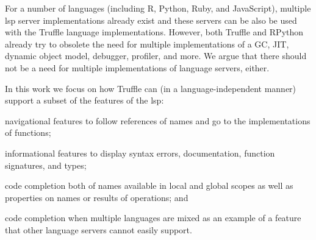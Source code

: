 \documentclass[sigplan,10pt,screen]{acmart}
\begin{document}

For a number of languages (including R, Python, Ruby, and JavaScript), multiple
\ac{lsp} server implementations already exist and these servers can be also be
used with the Truffle language implementations. However, both Truffle and
RPython already try to obsolete the need for multiple implementations of a GC,
JIT, dynamic object model, debugger, profiler, and more. We argue that there
should not be a need for multiple implementations of language servers, either.

In this work we focus on how Truffle can (in a language-independent manner)
support a subset of the features of the \ac{lsp}:
\begin{enumerate*}[label=\bf\arabic*) ]%
\item navigational features to follow references of names and go to the
  implementations of functions;
\item informational features to display syntax errors, documentation, function signatures, and types;
\item code completion both of names available in local and global scopes as well
  as properties on names or results of operations; and
\item code completion when multiple languages are mixed as an example of a
  feature that other language servers cannot easily support.
\end{enumerate*}
\end{document}
